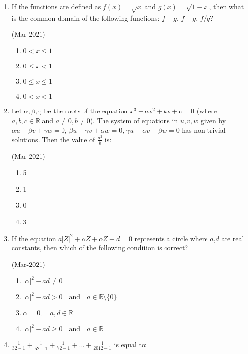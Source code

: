 \documentclass[journal,12pt,onecolumn]{IEEEtran}
\theoremstyle{remark}
\begin{document}
\begin{enumerate}
	\item
		If the functions are defined as $f(x)=\sqrt{x}$ and $g(x)=\sqrt{1-x}$, then what is the common domain of the following functions: $f+g$, $f-g$, $f/g$?

		\hfill{(Mar-2021)}
		\begin{multicols}{4}
		\begin{enumerate}
    \item $0 < x \leq 1$
    \item $0 \leq x < 1$
    \item $0 \leq x \leq 1$
    \item $0 < x < 1$
                \end{enumerate}
		\end{multicols}
	\item
		Let $\alpha, \beta, \gamma$ be the roots of the equation $x^3 + ax^2 + bx + c = 0$ (where $a, b, c \in \mathbb{R}$ and $a \neq 0, b \neq 0$). The system of equations in $u, v, w$ given by $\alpha u + \beta v + \gamma w = 0$, $\beta u + \gamma v + \alpha w = 0$, $\gamma u + \alpha v + \beta w = 0$ has non-trivial solutions. Then the value of $\frac{a^2}{b}$ is:

			\hfill{(Mar-2021)}
		\begin{multicols}{4}
               \begin{enumerate}
    \item 5
    \item 1
    \item 0
    \item 3
               \end{enumerate}
		\end{multicols}
       \item
	       If the equation $a{|Z|}^2 + \bar{\alpha}Z + \alpha \bar{Z} + d = 0$ represents a circle where $a$,$d$ are real constants, then which of the following condition is correct?

			\hfill{(Mar-2021)}
			\begin{multicols}{2}
		\begin{enumerate}
    \item $|\alpha|^2 - ad \neq 0$
    \item $|\alpha|^2 - ad > 0 \quad \text{and} \quad a \in \mathbb{R} \setminus \{0\}$
    \item $\alpha = 0, \quad a, d \in \mathbb{R}^+$
    \item $|\alpha|^2 - ad \geq 0 \quad \text{and} \quad a \in \mathbb{R}$
                \end{enumerate}
			\end{multicols}
	\item
		$ \frac{1}{32 - 1} + \frac{1}{52 - 1} + \frac{1}{72 - 1} + \ldots + \frac{1}{2012 - 1} $ is equal to:


\end{enumerate}
\end{document}
